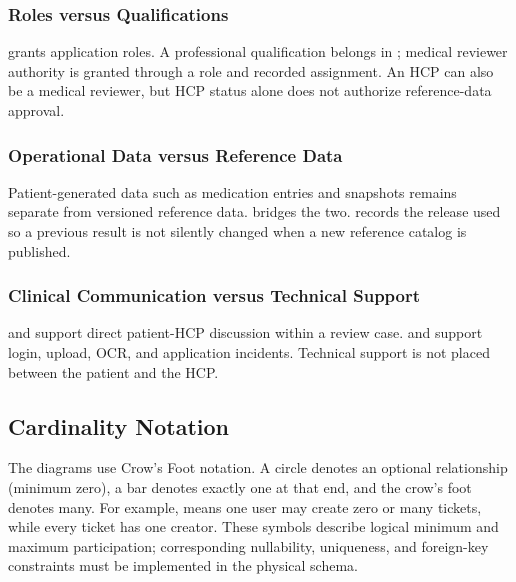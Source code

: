 \subsubsection{Roles versus Qualifications}

 grants application roles. A professional qualification belongs in ; medical reviewer authority is granted through a role and recorded assignment. An HCP can also be a medical reviewer, but HCP status alone does not authorize reference-data approval.

\subsubsection{Operational Data versus Reference Data}

Patient-generated data such as medication entries and snapshots remains separate from versioned reference data.  bridges the two.  records the release used so a previous result is not silently changed when a new reference catalog is published.

\subsubsection{Clinical Communication versus Technical Support}

 and  support direct patient-HCP discussion within a review case.  and  support login, upload, OCR, and application incidents. Technical support is not placed between the patient and the HCP.

\subsection{Cardinality Notation}

The diagrams use Crow's Foot notation. A circle denotes an optional relationship (minimum zero), a bar denotes exactly one at that end, and the crow's foot denotes many. For example,  means one user may create zero or many tickets, while every ticket has one creator. These symbols describe logical minimum and maximum participation; corresponding nullability, uniqueness, and foreign-key constraints must be implemented in the physical schema.

